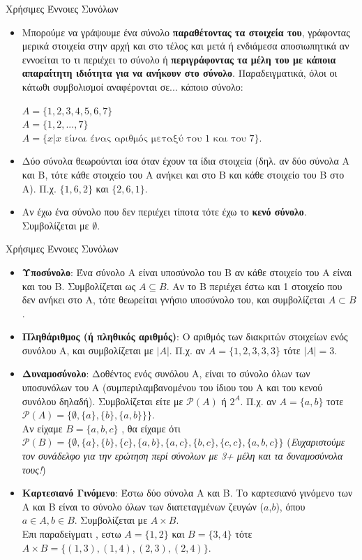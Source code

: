 \documentclass[size=14pt, paper=smartboard, style=fyma, mode=present]{powerdot}
\begin{document}
\begin{slide}[toc=]{Χρήσιμες Έννοιες Συνόλων}
\begin{itemize}
	\item Μπορούμε να γράψουμε ένα σύνολο \textbf{παραθέτοντας τα στοιχεία του}, γράφοντας μερικά στοιχεία στην αρχή και στο τέλος και μετά ή ενδιάμεσα αποσιωπητικά αν εννοείται το τι περιέχει το σύνολο ή \textbf{περιγράφοντας τα μέλη του με κάποια απαραίτητη ιδιότητα για να ανήκουν στο σύνολο}. Παραδειγματικά, όλοι οι κάτωθι συμβολισμοί αναφέρονται σε... κάποιο σύνολο:
	\pause
	\begin{center}
		$A = \{1,2,3,4,5,6,7\}$ \\
		$A = \{1,2,...,7\}$ \\
		$A = \text{\{$x | x$ είναι ένας αριθμός μεταξύ του 1 και του 7\}.}$ 
	\end{center}
	\pause 
	\item Δύο σύνολα θεωρούνται ίσα όταν έχουν τα ίδια στοιχεία (δηλ. αν δύο σύνολα Α και Β, τότε κάθε στοιχείο του Α ανήκει και στο Β και κάθε στοιχείο του Β στο Α). Π.χ. $\{1,6,2\}$ και $\{2,6,1\}$.
	\pause
	\item Αν έχω ένα σύνολο που δεν περιέχει τίποτα τότε έχω το \textbf{κενό σύνολο}. Συμβολίζεται με $\emptyset$.
	
\end{itemize}
	\end{slide}
\begin{slide}[toc=]{Χρήσιμες Έννοιες Συνόλων}
		\begin{itemize}
			\item \textbf{Υποσύνολο}: Ένα σύνολο Α είναι υποσύνολο του Β αν κάθε στοιχείο του Α είναι και του Β. Συμβολίζεται ως $ A \subseteq B$. Αν το Β περιέχει έστω και 1 στοιχείο που δεν ανήκει στο Α, τότε θεωρείται γνήσιο υποσύνολο του, και συμβολίζεται $ A \subset B$. 
			\pause
			\item \textbf{Πληθάριθμος (ή πληθικός αριθμός)}: Ο αριθμός των διακριτών στοιχείων ενός συνόλου A, και συμβολίζεται με $|A|$. Π.χ. αν $A = \{1,2,3,3,3\}$ τότε $|A|=3$. \pause
			\item \textbf{Δυναμοσύνολο}: Δοθέντος ενός συνόλου Α, είναι το σύνολο όλων των υποσυνόλων του Α (συμπεριλαμβανομένου του ίδιου του Α και του κενού συνόλου δηλαδή). Συμβολίζεται είτε με $\mathcal{P}(A)$ ή $2^A$. Π.χ. αν $A=\{a,b\}$ τοτε $\mathcal{P}(A) = \{\emptyset,\{a\}, \{b\}, \{a,b\}  \}\}$.
			\\ Αν είχαμε $Β=\{a,b,c\}$ , θα είχαμε ότι $\mathcal{P}(B)=\{
			\emptyset,\{a\}, \{b\}, \{c\}, \{a,b\}, \{a,c\},
			\{b,c\}, \{c,c\}, \{a,b,c\}
			\}$
			(\textit{Ευχαριστούμε τον συνάδελφο για την ερώτηση περί σύνολων με 3+ μέλη και τα δυναμοσύνολα τους!}) \pause
			\item \textbf{Καρτεσιανό Γινόμενο}: Έστω δύο σύνολα Α και Β. Το καρτεσιανό γινόμενο των Α και Β είναι το σύνολο όλων των διατεταγμένων ζευγών ($a$,$b$), όπου $a \in A , b \in B$. Συμβολίζεται με $A \times B$. 
			\\
			Επι παραδείγματι , εστω $A=\{1,2\}$ και $B=\{3,4\}$ τότε $A\times B=\{(1,3),(1,4),(2,3),(2,4)\}$.
		\end{itemize}
\end{slide}
\end{document}
